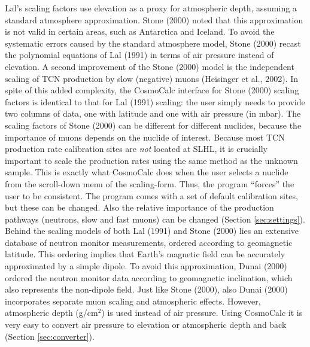 \documentclass{article}
\begin{document}
Lal's scaling factors use elevation  as a proxy for atmospheric depth,
assuming a standard atmosphere approximation.  Stone (2000) noted that
this approximation is  not valid in certain areas,  such as Antarctica
and Iceland.   To avoid the  systematic errors caused by  the standard
atmosphere model, Stone (2000)  recast the polynomial equations of Lal
(1991) in  terms  of air  pressure  instead  of  elevation.  A  second
improvement of  the Stone (2000)  model is the independent  scaling of
TCN production by slow (negative)  muons (Heisinger et al., 2002).  In
spite  of this  added complexity,  the CosmoCalc  interface  for Stone
(2000) scaling factors  is identical to  that for Lal  (1991) scaling:
the  user  simply needs  to  provide two  columns  of  data, one  with
latitude and one  with air pressure (in mbar).  The scaling factors of
Stone  (2000) can  be different  for different  nuclides,  because the
importance of muons  depends on the nuclide of  interest. Because most
TCN production rate  calibration sites are {\it not}  located at SLHL,
it is crucially important to scale the production rates using the same
method as  the unknown  sample.  This is  exactly what  CosmoCalc does
when  the user  selects a  nuclide from  the scroll-down  menu  of the
scaling-form. Thus, the program ``forces''  the user to be consistent. 
The program comes  with a set of default  calibration sites, but these
can  be  changed.  Also  the  relative  importance  of the  production
pathways  (neutrons, slow  and  fast muons)  can  be changed  (Section
\ref{sec:settings}).
\\

Behind the scaling models of both  Lal (1991) and Stone (2000) lies an
extensive database of  neutron monitor measurements, ordered according
to geomagnetic  latitude. This ordering implies  that Earth's magnetic
field can be accurately approximated by a simple dipole. To avoid this
approximation, Dunai (2000) ordered the neutron monitor data according
to  geomagnetic  inclination,  which  also represents  the  non-dipole
field.   Just  like  Stone  (2000),  also  Dunai  (2000)  incorporates
separate  muon scaling and  atmospheric effects.  However, atmospheric
depth (g/cm$^2$) is used instead  of air pressure.  Using CosmoCalc it
is very easy to convert air pressure to elevation or atmospheric depth
and back (Section \ref{sec:converter}).
\\
\end{document}
